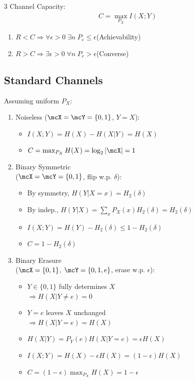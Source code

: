\documentclass[12pt, a4paper]{article}
\begin{document}
\begin{multicols*}{3}
Channel Capacity:
\begin{align*}
  C=\max_{P_X}I(X;Y)
\end{align*}
\begin{enumerate}[\roman*.]
  \item $R<C\Rightarrow\forall\epsilon>0\;\exists n\; P_e\le\epsilon$\hfill(Achievability)
  \item $R>C\Rightarrow\exists\epsilon>0\;\forall n\; P_e>\epsilon$\hfill(Converse)
\end{enumerate}

\subsection{Standard Channels}
Assuming uniform $P_X$:
\begin{enumerate}[\roman*.]
  \item Noiseless ($\mcX=\mcY=\{0,1\}$, $Y=X$):
    \begin{itemize}[leftmargin=*]\vspace{3pt}
      \item $I(X;Y)=H(X)-H(X|Y)=H(X)$
      \item $C=\max_{P_X}H(X)=\log_2|\mcX|=1$
    \end{itemize}
  \item Binary Symmetric \\($\mcX=\mcY=\{0,1\}$, flip w.p. $\delta$):
    \begin{itemize}[leftmargin=*]\vspace{3pt}
      \item By symmetry, $H(Y|X=x)=H_2(\delta)$
      \item By indep., $H(Y|X)=\sum_x P_X(x)H_2(\delta)=H_2(\delta)$
      \item $I(X;Y)=H(Y)-H_2(\delta) \leq 1 - H_2(\delta)$
      \item $C=1-H_2(\delta)$
    \end{itemize}
  \item Binary Erasure \\($\mcX=\{0,1\}$, $\mcY=\{0,1,e\}$, erase w.p. $\epsilon$):
    \begin{itemize}[leftmargin=*]\vspace{3pt}
      \item $Y\in\{0,1\}$ fully determines $X$\\$\Rightarrow H(X|Y\neq e)=0$
      \item $Y=e$ leaves $X$ unchanged\\$\Rightarrow H(X|Y=e)=H(X)$
      \item $H(X|Y)=P_Y(e)H(X|Y=e)=\epsilon H(X)$
      \item $I(X;Y)=H(X)-\epsilon H(X)=(1-\epsilon)H(X)$
      \item $C=(1-\epsilon)\max_{P_X}H(X)=1-\epsilon$
    \end{itemize}
\end{enumerate}
 

\end{multicols*}
\end{document}
